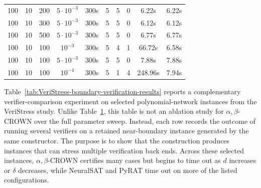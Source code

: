 \documentclass{article}
\theoremstyle{definition}
\begin{document}
\begin{table}[th]
\begin{tabular}{c c c c c c c c c c}
100 & 10 & 200 & $5\cdot10^{-3}$ & 300s & 5 & 5 & 0 & 6.22s  & 6.22s \\
100 & 10 & 300 & $5\cdot10^{-3}$ & 300s & 5 & 5 & 0 & 6.12s  & 6.12s \\
100 & 10 & 500 & $5\cdot10^{-3}$ & 300s & 5 & 5 & 0 & 6.77s  & 6.77s \\
\midrule
100 & 10 & 100 & $10^{-3}$       & 300s & 5 & 4 & 1 & 66.72s & 6.58s \\
100 & 10 & 100 & $5\cdot10^{-3}$ & 300s & 5 & 5 & 0 & 7.88s  & 7.88s \\
100 & 10 & 100 & $10^{-4}$       & 300s & 5 & 1 & 4 & 248.96s & 7.94s \\
\bottomrule
\end{tabular}
\label{tab:boundary-verification-results}
\end{table}

Table~\ref{tab:VeriStress-boundary-verification-results} reports a complementary verifier-comparison experiment on selected polynomial-network instances from the VeriStress study. Unlike Table~\ref{tab:boundary-verification-results}, this table is not an ablation study for $\alpha,\beta$-CROWN over the full parameter sweep. Instead, each row records the outcome of running several verifiers on a retained near-boundary instance generated by the same constructor. The purpose is to show that the construction produces instances that can stress multiple verification back ends. Across these selected instances, $\alpha,\beta$-CROWN certifies many cases but begins to time out as $d$ increases or $\delta$ decreases, while NeuralSAT and PyRAT time out on more of the listed configurations.
\end{document}

